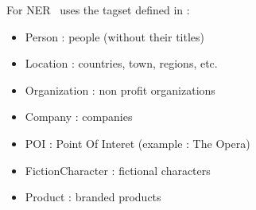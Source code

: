 \documentclass[manual-fr.tex]{subfiles}
\begin{document}
For NER \SEM\ uses the tagset defined in \cite{sagot2012annotation} :\\

\begin{itemize}
	\item[] Person : people (without their titles)
	\item[] Location : countries, town, regions, etc.
	\item[] Organization : non profit organizations
	\item[] Company : companies
	\item[] POI : Point Of Interet (example : The Opera)
	\item[] FictionCharacter : fictional characters
	\item[] Product : branded products
\end{itemize}
\end{document}
